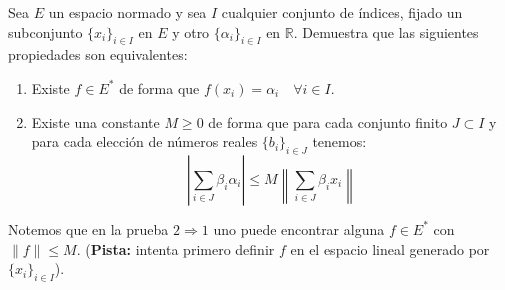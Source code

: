 \begin{ejercicio}%
    Sea $E$ un espacio normado y sea $I$ cualquier conjunto de índices, fijado un subconjunto $\{x_i\}_{i \in I}$ en $E$ y otro $\{\alpha_i\}_{i \in I}$ en $\mathbb{R}$. Demuestra que las siguientes propiedades son equivalentes:
    \begin{enumerate}
        \item Existe $f\in E^\ast$ de forma que $f(x_i) = \alpha_i\quad \forall i \in I$.
        \item Existe una constante $M\geq 0$ de forma que para cada conjunto finito $J\subset I$ y para cada elección de números reales $\{b_i\}_{i \in J}$ tenemos:
            \begin{equation*}
                \left|\sum_{i \in J}\beta_i \alpha_i\right| \leq M \left\|\sum_{i \in J} \beta_i x_i\right\|
            \end{equation*}
    \end{enumerate}
    Notemos que en la prueba $2\Longrightarrow 1$ uno puede encontrar alguna $f\in E^\ast$ con $\|f\| \leq M$. (\textbf{Pista:} intenta primero definir $f$ en el espacio lineal generado por $\{x_i\}_{i \in I}$).
\end{ejercicio}






